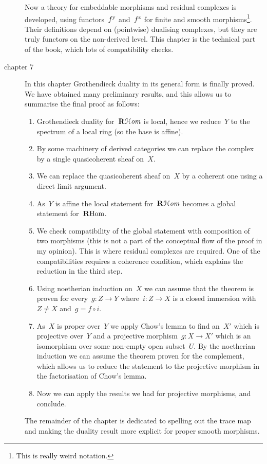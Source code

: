 \documentclass[10pt,a4paper]{article}
\begin{document}
\begin{description}
    Now a theory for embeddable morphisms and residual complexes is developed, using functors~$f^{\mathrm{y}}$ and~$f^{\mathrm{z}}$ for finite and smooth morphisms\footnote{This is really weird notation.}. Their definitions depend on (pointwise) dualising complexes, but they are truly functors on the non-derived level. This chapter is the technical part of the book, which lots of compatibility checks.

  \item[chapter 7] In this chapter Grothendieck duality in its general form is finally proved. We have obtained many preliminary results, and this allows us to summarise the final proof \cite[theorem VII.3.3]{hartshorne-residues-and-duality} as follows:
    \begin{enumerate}
      \item Grothendieck duality for~$\operatorname{\mathbf{R}\mathcal{H}\mathit{om}}$ is local, hence we reduce~$Y$ to the spectrum of a local ring (so the base is affine).
      \item By some machinery of derived categories we can replace the complex by a single quasicoherent sheaf on~$X$.
      \item We can replace the quasicoherent sheaf on~$X$ by a coherent one using a direct limit argument.
      \item As~$Y$ is affine the local statement for~$\operatorname{\mathbf{R}\mathcal{H}\mathit{om}}$ becomes a global statement for~$\operatorname{\mathbf{R}Hom}$.
      \item We check compatibility of the global statement with composition of two morphisms (this is not a part of the conceptual flow of the proof in my opinion). This is where residual complexes are required. One of the compatibilities requires a coherence condition, which explains the reduction in the third step.
      \item Using noetherian induction on~$X$ we can assume that the theorem is proven for every~$g\colon Z\to Y$ where~$i\colon Z\to X$ is a closed immersion with~$Z\neq X$ and~$g=f\circ i$.
      \item As~$X$ is proper over~$Y$ we apply Chow's lemma to find an~$X'$ which is projective over~$Y$ and a projective morphism~$g\colon X\to X'$ which is an isomorphism over some non-empty open subset~$U$. By the noetherian induction we can assume the theorem proven for the complement, which allows us to reduce the statement to the projective morphism in the factorisation of Chow's lemma.
      \item Now we can apply the results we had for projective morphisms, and conclude.
    \end{enumerate}
    The remainder of the chapter is dedicated to spelling out the trace map and making the duality result more explicit for proper smooth morphisms.
\end{description}
\end{document}
